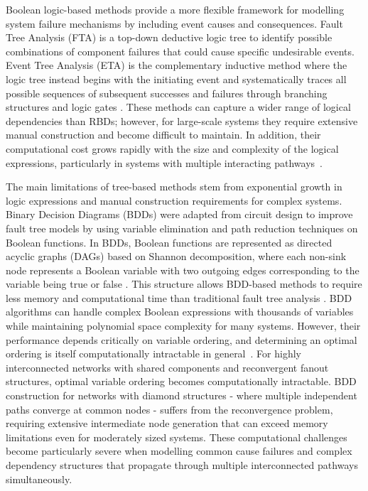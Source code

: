 \documentclass[preprint,12pt]{elsarticle}
\begin{document}
Boolean logic-based methods provide a more flexible framework for modelling system failure mechanisms by including event causes and consequences. Fault Tree Analysis (FTA) \cite{xing_fault_2008} is a top-down deductive logic tree to identify possible combinations of component failures that could cause specific undesirable events. Event Tree Analysis (ETA) is the complementary inductive method where the logic tree instead begins with the initiating event and systematically traces all possible sequences of subsequent successes and failures through branching structures and logic gates \cite{cepin_event_2011}.  These methods can capture a wider range of logical dependencies than RBDs; however, for large-scale systems they require extensive manual construction and become difficult to maintain. In addition, their computational cost grows rapidly with the size and complexity of the logical expressions, particularly in systems with multiple interacting pathways~\cite{sherwin_fault_1993,xing_fault_2008}.

The main limitations of tree-based methods stem from exponential growth in logic expressions and manual construction requirements for complex systems. Binary Decision Diagrams (BDDs)\cite{rauzy_new_1993,bryant_graph-based_1986, brace_efficient_1990} were adapted from circuit design to improve fault tree models by using variable elimination and path reduction techniques on Boolean functions. In BDDs, Boolean functions are represented as directed acyclic graphs (DAGs) based on Shannon decomposition, where each non-sink node represents a Boolean variable with two outgoing edges corresponding to the variable being true or false \cite{xing_fault_2008}. This structure allows BDD-based methods to require less memory and computational time than traditional fault tree analysis \cite{rauzy_new_1993}.
BDD algorithms can handle complex Boolean expressions with thousands of variables while maintaining polynomial space complexity for many systems. However, their performance depends critically on variable ordering, and determining an optimal ordering is itself computationally intractable in general~\cite{bryant_ordered_nodate}. For highly interconnected networks with shared components and reconvergent fanout structures, optimal variable ordering becomes computationally intractable. 
BDD construction for networks with diamond structures - where multiple independent paths converge at common nodes - suffers from the reconvergence problem, requiring extensive intermediate node generation that can exceed memory limitations even for moderately sized systems. These computational challenges become particularly severe when modelling common cause failures and complex dependency structures that propagate through multiple interconnected pathways simultaneously.
\end{document}
